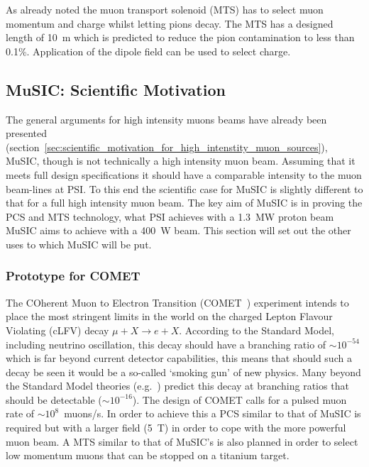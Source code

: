 As already noted the muon transport solenoid (MTS) has to select muon momentum and charge whilst letting pions decay. The MTS has a designed length of 10~m which is predicted to reduce the pion contamination to less than 0.1\%. Application of the dipole field can be used to select charge.

\subsection{MuSIC: Scientific Motivation} %
\label{sec:music_scientific_motivation}
The general arguments for high intensity muons beams have already been presented (section~\ref{sec:scientific_motivation_for_high_intenstity_muon_sources}), MuSIC, though is not technically a high intensity muon beam. Assuming that it meets full design specifications it should have a comparable intensity to the muon beam-lines at PSI. To this end the scientific case for MuSIC is slightly different to that for a full high intensity muon beam. The key aim of MuSIC is in proving the PCS and MTS technology, what PSI achieves with a 1.3~MW proton beam MuSIC aims to achieve with a 400~W beam. This section will set out the other uses to which MuSIC will be put.

\subsubsection{Prototype for COMET} %
\label{sub:prototype_for_comet}
The COherent Muon to Electron Transition (COMET~\cite{comet_cdr}) experiment intends to place the most stringent limits in the world on the charged Lepton Flavour Violating (cLFV) decay \( \mu + X \rightarrow e + X \). According to the Standard Model, including neutrino oscillation, this decay should have a branching ratio of \( \sim 10^{-54} \) which is far beyond current detector capabilities, this means that should such a decay be seen it would be a so-called `smoking gun' of new physics. Many beyond the Standard Model theories (e.g.\ \cite{clfv_in_susy}) predict this decay at branching ratios that should be detectable (\(\sim 10^{-16}\)). The design of COMET calls for a pulsed muon rate of \( \sim 10^8 \)~muons/s. In order to achieve this a PCS similar to that of MuSIC is required but with a larger field (5~T) in order to cope with the more powerful muon beam. A MTS similar to that of MuSIC's is also planned in order to select low momentum muons that can be stopped on a titanium target.

